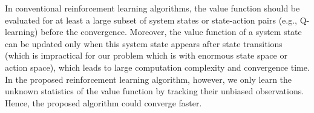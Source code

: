 \begin{remark}
    {
        In conventional reinforcement learning algorithms, the value function should be evaluated for at least a large subset of system states or state-action pairs (e.g., Q-learning) before the convergence.
        Moreover, the value function of a system state can be updated only when this system state appears after state transitions (which is impractical for our problem which is with enormous state space or action space), which leads to large computation complexity and convergence time.
        In the proposed reinforcement learning algorithm, however, we only learn the unknown statistics of the value function by tracking their unbiased observations.
        Hence, the proposed algorithm could converge faster.
    }%
\end{remark}
